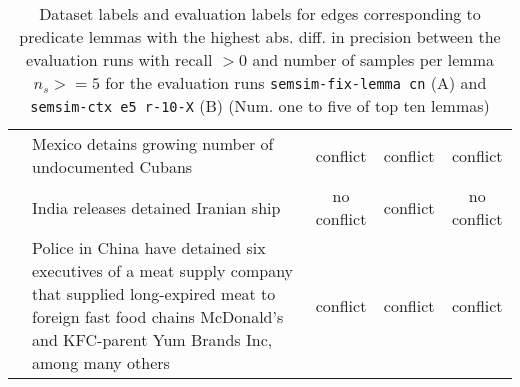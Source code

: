 \begin{sidewaystable}[ht]
\begin{tabular}{l p{13cm} ccc}
& Mexico detains growing number of undocumented Cubans & conflict & conflict & conflict \\
& India releases detained Iranian ship & no conflict & conflict & no conflict \\
& Police in China have detained six executives of a meat supply company that supplied long-expired meat to foreign fast food chains McDonald’s and KFC-parent Yum Brands Inc, among many others & conflict & conflict & conflict \\
\bottomrule
\end{tabular}
\caption{Dataset labels and evaluation labels for edges corresponding to predicate lemmas with the highest abs. diff. in precision between the evaluation runs with recall \(> 0\) and number of samples per lemma \(n_s >= 5\) for the evaluation runs \texttt{semsim-fix-lemma cn} (A) and \texttt{semsim-ctx e5 r-10-X} (B) (Num. one to five of top ten lemmas)}
\end{sidewaystable}


